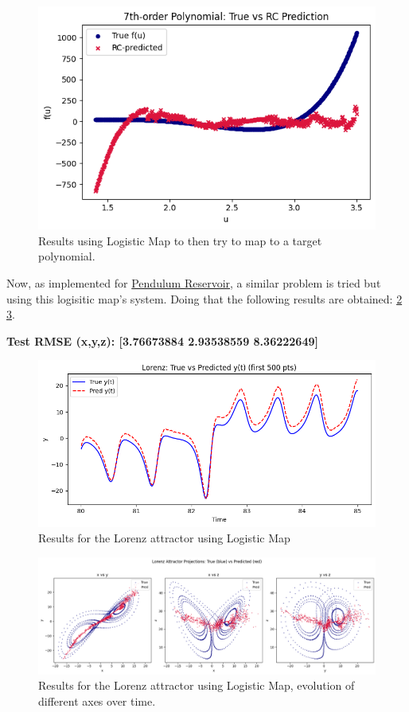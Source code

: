 \documentclass[numbered]{ivt-style/standard}
\begin{document}
\begin{figure}[H]
    \centering
    \includegraphics[width=0.75\linewidth]{figures/logistic_7th_degree.png}
    \caption{Results using Logistic Map to then try to map to a target polynomial.}
    \label{fig:logistic_map}
\end{figure}

Now, as implemented for \hyperref[pendulum_res]{Pendulum Reservoir}, a similar problem is tried but using this logisitic map's system. Doing that the following results are obtained: \ref{fig:logistic_map_lorenz} \ref{fig:logistic_map_lorenz_diag}.

\textbf{Test RMSE (x,y,z): [3.76673884 2.93538559 8.36222649]}

\begin{figure}[H]
    \centering
    \includegraphics[width=1\linewidth]{figures/lorentz_logistic_pred_true.png}
    \caption{Results for the Lorenz attractor using Logistic Map}
    \label{fig:logistic_map_lorenz}
\end{figure}

\begin{figure}[H]
    \centering
    \includegraphics[width=1\linewidth]{figures/lorenz_logistic_pred_diagram.png}
    \caption{Results for the Lorenz attractor using Logistic Map, evolution of different axes over time.}
    \label{fig:logistic_map_lorenz_diag}
\end{figure}
\end{document}
